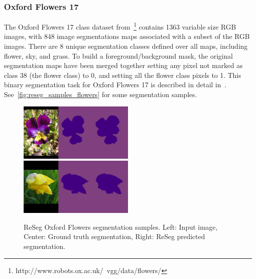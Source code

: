 
\subsubsection{Oxford Flowers 17}
The Oxford Flowers 17 class dataset from~\citep{Nilsback06}\footnote{%
http://www.robots.ox.ac.uk/~vgg/data/flowers/} contains 1363
variable size RGB images, with 848 image segmentations maps associated with
a subset of the RGB images. There are 8 unique segmentation classes defined
over all maps, including flower, sky, and grass. To build a
foreground/background mask, the original segmentation maps have been merged
together setting any pixel not marked as class 38 (the flower class) to 0, and
setting all the flower class pixels to 1. This binary segmentation task for
Oxford Flowers 17 is described in detail in~\citep{Xiaomeng14}.
See~\autoref{fig:reseg_samples_flowers} for some segmentation samples.

\begin{figure}[t!]
    \centering
    \includegraphics[width=0.5\textwidth]{img/reseg/samples/flowers1.jpg}\\
    \vspace{0.1em}
    \includegraphics[width=0.5\textwidth]{img/reseg/samples/flowers2.jpg}
    \caption{ReSeg Oxford Flowers segmentation samples.
        Left: Input image, Center: Ground truth segmentation,
        Right: ReSeg predicted segmentation.}
    \label{fig:reseg_samples_flowers}
\end{figure}

